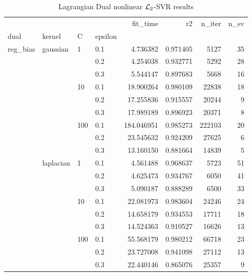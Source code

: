 \begin{table}[H]
\centering
\caption{Lagrangian Dual nonlinear $\protect \mathcal{L}_2$-SVR results}
\label{nonlinear_lagrangian_dual_l2_svr_cv_results}
\begin{tabular}{llllrrrr}
\toprule
           &           &     &     &    fit\_time &        r2 &  n\_iter &  n\_sv \\
dual & kernel & C & epsilon &             &           &         &       \\
\midrule
reg\_bias & gaussian & 1   & 0.1 &    4.736382 &  0.971405 &    5127 &    35 \\
           &           &     & 0.2 &    4.254038 &  0.932771 &    5292 &    28 \\
           &           &     & 0.3 &    5.544147 &  0.897683 &    5668 &    16 \\
           &           & 10  & 0.1 &   18.900264 &  0.980109 &   22838 &    18 \\
           &           &     & 0.2 &   17.255836 &  0.915557 &   20244 &     9 \\
           &           &     & 0.3 &   17.989189 &  0.896923 &   20371 &     8 \\
           &           & 100 & 0.1 &  184.046951 &  0.985273 &  222103 &    20 \\
           &           &     & 0.2 &   23.545632 &  0.924209 &   27625 &     6 \\
           &           &     & 0.3 &   13.160150 &  0.881664 &   14839 &     5 \\
           & laplacian & 1   & 0.1 &    4.561488 &  0.968637 &    5723 &    51 \\
           &           &     & 0.2 &    4.625473 &  0.934767 &    6050 &    41 \\
           &           &     & 0.3 &    5.090187 &  0.888289 &    6500 &    33 \\
           &           & 10  & 0.1 &   22.081973 &  0.983604 &   24246 &    24 \\
           &           &     & 0.2 &   14.658179 &  0.934553 &   17711 &    18 \\
           &           &     & 0.3 &   14.524363 &  0.910527 &   16626 &    13 \\
           &           & 100 & 0.1 &   55.568179 &  0.980212 &   66718 &    23 \\
           &           &     & 0.2 &   23.727008 &  0.941098 &   27112 &    13 \\
           &           &     & 0.3 &   22.440146 &  0.865076 &   25357 &     9 \\

\end{tabular}
\end{table}
